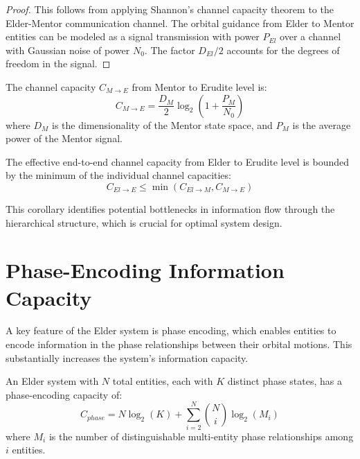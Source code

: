 \begin{proof}
This follows from applying Shannon's channel capacity theorem to the Elder-Mentor communication channel. The orbital guidance from Elder to Mentor entities can be modeled as a signal transmission with power $P_{El}$ over a channel with Gaussian noise of power $N_0$. The factor $D_{El}/2$ accounts for the degrees of freedom in the signal.
\end{proof}

\begin{theorem}
The channel capacity $C_{M \to E}$ from Mentor to Erudite level is:
\begin{equation}
C_{M \to E} = \frac{D_M}{2} \log_2\left(1 + \frac{P_M}{N_0}\right)
\end{equation}
where $D_M$ is the dimensionality of the Mentor state space, and $P_M$ is the average power of the Mentor signal.
\end{theorem}

\begin{corollary}
The effective end-to-end channel capacity from Elder to Erudite level is bounded by the minimum of the individual channel capacities:
\begin{equation}
C_{El \to E} \leq \min(C_{El \to M}, C_{M \to E})
\end{equation}
\end{corollary}

This corollary identifies potential bottlenecks in information flow through the hierarchical structure, which is crucial for optimal system design.

\section{Phase-Encoding Information Capacity}



A key feature of the Elder system is phase encoding, which enables entities to encode information in the phase relationships between their orbital motions. This substantially increases the system's information capacity.

\begin{theorem}
An Elder system with $N$ total entities, each with $K$ distinct phase states, has a phase-encoding capacity of:
\begin{equation}
C_{phase} = N \log_2(K) + \sum_{i=2}^{N} \binom{N}{i} \log_2(M_i)
\end{equation}
where $M_i$ is the number of distinguishable multi-entity phase relationships among $i$ entities.
\end{theorem}

